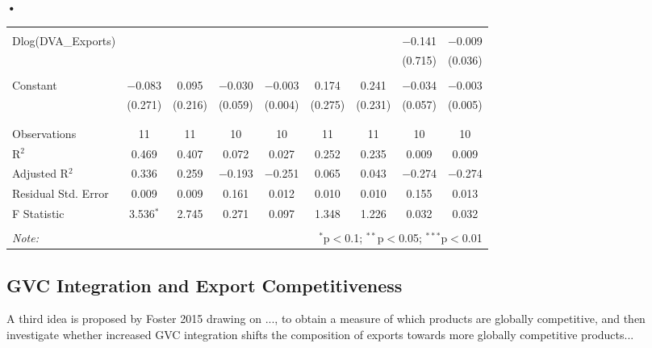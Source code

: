 \textbf{\textbf{•}}\documentclass[a4paper]{article}
\begin{document}
\begin{table}[!htbp]
{\begin{tabular}{@{\extracolsep{5pt}}lcccccccc}
  & & & & & & & & \\ 
 Dlog(DVA\_Exports) &  &  &  &  &  &  & $-$0.141 & $-$0.009 \\ 
  &  &  &  &  &  &  & (0.715) & (0.036) \\ 
  & & & & & & & & \\ 
 Constant & $-$0.083 & 0.095 & $-$0.030 & $-$0.003 & 0.174 & 0.241 & $-$0.034 & $-$0.003 \\ 
  & (0.271) & (0.216) & (0.059) & (0.004) & (0.275) & (0.231) & (0.057) & (0.005) \\ 
  & & & & & & & & \\ 
\hline \\[-1.8ex] 
Observations & 11 & 11 & 10 & 10 & 11 & 11 & 10 & 10 \\ 
R$^{2}$ & 0.469 & 0.407 & 0.072 & 0.027 & 0.252 & 0.235 & 0.009 & 0.009 \\ 
Adjusted R$^{2}$ & 0.336 & 0.259 & $-$0.193 & $-$0.251 & 0.065 & 0.043 & $-$0.274 & $-$0.274 \\ 
Residual Std. Error & 0.009 & 0.009 & 0.161 & 0.012 & 0.010 & 0.010 & 0.155 & 0.013 \\ 
F Statistic & 3.536$^{*}$ & 2.745 & 0.271 & 0.097 & 1.348 & 1.226 & 0.032 & 0.032 \\ 
\hline 
\hline \\[-1.8ex] 
\textit{Note:}  & \multicolumn{8}{r}{$^{*}$p$<$0.1; $^{**}$p$<$0.05; $^{***}$p$<$0.01} \\ 
\end{tabular} 
}
\end{table} 
\FloatBarrier



\subsection{GVC Integration and Export Competitiveness}
A third idea is proposed by Foster 2015 drawing on ..., to obtain a measure of which products are globally competitive, and then investigate whether increased GVC integration shifts the composition of exports towards more globally competitive products... 





\newpage


\end{document}
